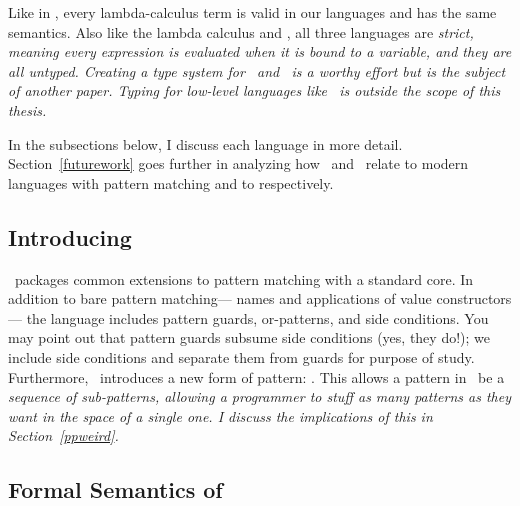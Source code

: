 \documentclass[manuscript,screen,review, 12pt, nonacm]{acmart}
\begin{document}
    Like in \VC, every lambda-calculus term is valid in our languages and has
    the same semantics. Also like the lambda calculus and \VC, all three
    languages are \it{strict}, meaning every expression is evaluated when it is
    bound to a variable, and they are all untyped. Creating a type system for
    \PPlus\ and \VMinus\ is a worthy effort but is the subject of another paper.
    Typing for low-level languages like \D\ is outside the scope of this thesis. 
    
    In the subsections below, I discuss each language in more detail.
    Section~\ref{futurework} goes further in analyzing how \PPlus\ and \VMinus\
    relate to modern languages with pattern matching and to \VC respectively. 

\subsection{Introducing \PPlus}
\label{pplus}

    \PPlus\ packages common extensions to pattern matching with a standard core.
    In addition to bare pattern matching— names and applications of value
    constructors— the language includes pattern guards, or-patterns, and side
    conditions. You may point out that pattern guards subsume side conditions
    (yes, they do!); we include side conditions and separate them from guards
    for purpose of study. Furthermore, \PPlus\ introduces a new form of pattern:
    \pcommap. This allows a pattern in \PPlus\ be a \it{sequence} of
    sub-patterns, allowing a programmer to stuff as many patterns as they want
    in the space of a single one. I discuss the implications of this in
    Section~\ref{ppweird}.

\subsection{Formal Semantics of \PPlus}
\end{document}
